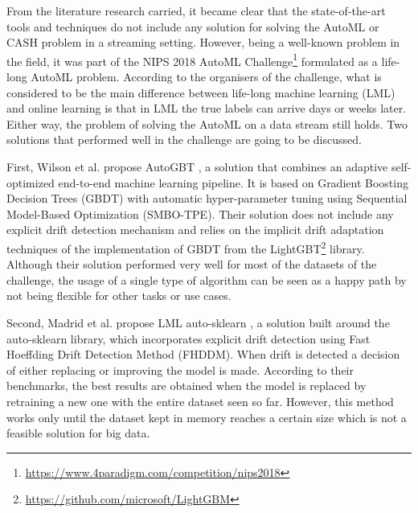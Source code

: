 \documentclass{sig-alternate-br}
\begin{document}
From the literature research carried, it became clear that the state-of-the-art tools and techniques do not include any solution for solving the AutoML or CASH problem in a streaming setting. However, being a well-known problem in the field, it was part of the NIPS 2018 AutoML Challenge\footnote{\url{https://www.4paradigm.com/competition/nips2018}} formulated as a life-long AutoML problem. According to the organisers of the challenge, what is considered to be the main difference between life-long machine learning (LML) and online learning is that in LML the true labels can arrive days or weeks later. Either way, the problem of solving the AutoML on a data stream still holds. Two solutions that performed well in the challenge are going to be discussed. 

First, Wilson et al. propose AutoGBT \cite{wilson2020automatically}, a solution that combines an adaptive self-optimized end-to-end machine learning pipeline. It is based on Gradient Boosting Decision Trees (GBDT) with automatic hyper-parameter tuning using Sequential Model-Based Optimization (SMBO-TPE). Their solution does not include any explicit drift detection mechanism and relies on the implicit drift adaptation techniques of the implementation of GBDT from the LightGBT\footnote{\url{https://github.com/microsoft/LightGBM}} library. Although their solution performed very well for most of the datasets of the challenge, the usage of a single type of algorithm can be seen as a happy path by not being flexible for other tasks or use cases.

Second, Madrid et al. propose LML auto-sklearn \cite{madrid2019towards}, a solution built around the auto-sklearn library, which incorporates explicit drift detection using Fast Hoeffding Drift Detection Method (FHDDM). When drift is detected a decision of either replacing or improving the model is made. According to their benchmarks, the best results are obtained when the model is replaced by retraining a new one with the entire dataset seen so far. However, this method works only until the dataset kept in memory reaches a certain size which is not a feasible solution for big data.
\end{document}
